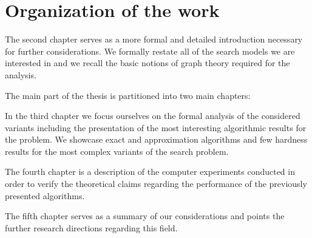 \section{Organization of the work}
The second chapter serves as a more formal and detailed introduction necessary for further considerations. We formally restate all of the search models we are interested in and we recall the basic notions of graph theory required for the analysis.

The main part of the thesis is partitioned into two main chapters:

In the third chapter we focus ourselves on the formal analysis of the considered variants including the presentation of the most interesting algorithmic results for the problem. We showcase exact and approximation algorithms and few hardness results for the most complex variants of the search problem. 

The fourth chapter is a description of the computer experiments conducted in order to verify the theoretical claims regarding the performance of the previously presented algorithms.

The fifth chapter serves as a summary of our considerations and points the further research directions regarding this field.

